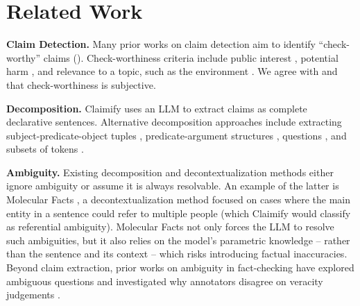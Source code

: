 \section{Related Work}
\label{sec:related_work}

\textbf{Claim Detection.} Many prior works on claim detection aim to identify ``check-worthy'' claims (\citealp{gencheva:2017, jaradat:2018, arslan:2020}). Check-worthiness criteria include public interest \citep{hassan:2017}, potential harm \citep{nakov:2022}, and relevance to a topic, such as the environment \citep{stammbach:2023}. We agree with \citet{konstantinovskiy:2021} and \citet{ni:2024} that check-worthiness is subjective.

\noindent\textbf{Decomposition.} Claimify uses an LLM to extract claims as complete declarative sentences. Alternative decomposition approaches include extracting subject-predicate-object tuples \citep{banko:2007, goodrich:2019, hu:2024:refchecker}, predicate-argument structures \citep{white:2016, zhang:2017, goyal:2020}, questions \citep{fan:2020, chen:2022}, and subsets of tokens \citep{chen:2023:propsegment}.

\noindent\textbf{Ambiguity.} Existing decomposition and decontextualization methods either ignore ambiguity or assume it is always resolvable. An example of the latter is Molecular Facts \citep{gunjal:2024}, a decontextualization method focused on cases where the main entity in a sentence could refer to multiple people (which Claimify would classify as referential ambiguity). Molecular Facts not only forces the LLM to resolve such ambiguities, but it also relies on the model’s parametric knowledge – rather than the sentence and its context – which risks introducing factual inaccuracies. Beyond claim extraction, prior works on ambiguity in fact-checking have explored ambiguous questions \citep{min:2020, kim:2023, zhang:2024} and investigated why annotators disagree on veracity judgements \citep{glockner:2024}.